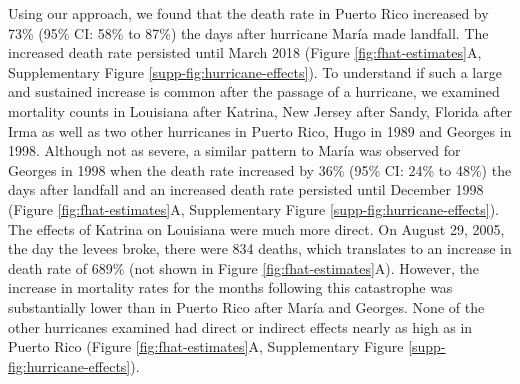 \documentclass[11pt]{article}
\begin{document}
Using our approach, we found that the death rate in Puerto Rico increased by 73\% (95\% CI: 58\% to 87\%) the days after hurricane Mar\'ia made landfall. The increased death rate persisted until March 2018 (Figure \ref{fig:fhat-estimates}A, Supplementary Figure \ref{supp-fig:hurricane-effects}). To understand if such a large and sustained increase is common after the passage of a hurricane, we examined mortality counts in Louisiana after Katrina, New Jersey after Sandy, Florida after Irma as well as two other hurricanes in Puerto Rico, Hugo in 1989 and Georges in 1998.  Although not as severe, a similar pattern to Mar\'ia was observed for Georges in 1998 when the death rate increased by 36\% (95\% CI: 24\% to 48\%) the days after landfall and an increased death rate persisted until December 1998 (Figure \ref{fig:fhat-estimates}A, Supplementary Figure \ref{supp-fig:hurricane-effects}). The effects of Katrina on Louisiana were much more direct. On August 29, 2005, the day the levees broke, there were 834 deaths, which translates to an increase in death rate of 689\% (not shown in Figure \ref{fig:fhat-estimates}A). However, the increase in mortality rates for the months following this catastrophe was substantially lower than in Puerto Rico after Mar\'ia and Georges. None of the other hurricanes examined had direct or indirect effects nearly as high as in Puerto Rico (Figure \ref{fig:fhat-estimates}A, Supplementary Figure \ref{supp-fig:hurricane-effects}).
\end{document}
